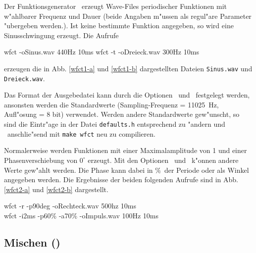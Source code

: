 Der Funktionsgenerator \wfct\ erzeugt Wave-Files periodischer Funktionen
mit w"ahlbarer Frequenz und Dauer (beide Angaben m"ussen als regul"are
Parameter "ubergeben werden.). Ist keine bestimmte Funktion
angegeben, so wird eine Sinusschwingung erzeugt. Die Aufrufe

{\btxt
  wfct -oSinus.wav 440Hz 10ms \txtund
  wfct -t -oDreieck.wav 300Hz 10ms 
\etxt}

\noindent erzeugen die in Abb. \ref{wfct1-a} und \ref{wfct1-b} dargestellten
Dateien {\tt Sinus.wav} und {\tt Dreieck.wav}.


Das Format der Ausgebedatei kann durch die Optionen \ und
\ festgelegt werden, ansonsten werden die Standardwerte
(Sampling-Frequenz = 11025~Hz, Aufl"osung = 8 bit) verwendet.
Werden andere Standardwerte gew"unscht, so sind die Eintr"age in
der Datei {\tt defaults.h} entsprechend zu "andern und \wfct\ 
anschlie"send mit {\tt make wfct} neu zu compilieren.

Normalerweise werden Funktionen mit einer Maximalamplitude von 1 und
einer Phasenverschiebung von $0^{\circ}$ erzeugt. Mit den Optionen
\opt{a}\ und \opt{p}\ k"onnen andere Werte gew"ahlt werden.
Die Phase kann dabei in \%\ der Periode oder als Winkel angegeben
werden. Die Ergebnisse der beiden folgenden Aufrufe sind in
Abb. \ref{wfct2-a} und \ref{wfct2-b} dargestellt.

{\btxt
  wfct -r -p90deg -oRechteck.wav 500hz 10ms     \\
  wfct -i2ms -p60\% -a70\% -oImpuls.wav 100Hz 10ms
\etxt}



\subsection{Mischen (\wmix)}



